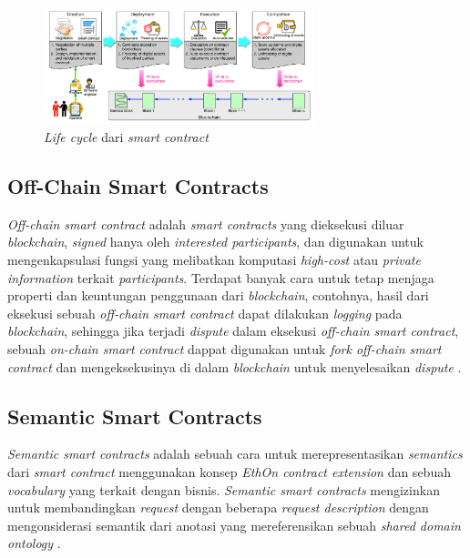 \begin{figure}
	\centering
	\includegraphics[width=0.7\textwidth]{resources/chapter-2/sc-lifecycle.png}
	\caption{\textit{Life cycle} dari \textit{smart contract} \parencite{zheng2020overview}}
	\label{image:sc-lifecycle}
\end{figure}

\subsection{Off-Chain Smart Contracts}
\label{subsec:off-chain-smart-contracts}

\textit{Off-chain smart contract} adalah \textit{smart contracts} yang dieksekusi diluar \textit{blockchain}, \textit{signed} hanya oleh \textit{interested participants}, dan digunakan untuk mengenkapsulasi fungsi yang melibatkan komputasi \textit{high-cost} atau \textit{private information} terkait \textit{participants}. Terdapat banyak cara untuk tetap menjaga properti dan keuntungan penggunaan dari \textit{blockchain}, contohnya, hasil dari eksekusi sebuah \textit{off-chain smart contract} dapat dilakukan \textit{logging} pada \textit{blockchain}, sehingga jika terjadi \textit{dispute} dalam eksekusi \textit{off-chain smart contract}, sebuah \textit{on-chain smart contract} dappat digunakan untuk \textit{fork off-chain smart contract} dan mengeksekusinya di dalam \textit{blockchain} untuk menyelesaikan \textit{dispute} \parencite{zou2019smart}.

\subsection{Semantic Smart Contracts}
\label{subsec:semantic-smart-contracts}
\textit{Semantic smart contracts} adalah sebuah cara untuk merepresentasikan \textit{semantics} dari \textit{smart contract} menggunakan konsep \textit{EthOn contract extension} dan sebuah \textit{vocabulary} yang terkait dengan bisnis. \textit{Semantic smart contracts} mengizinkan untuk membandingkan \textit{request} dengan beberapa \textit{request description} dengan mengonsiderasi semantik dari anotasi yang mereferensikan sebuah \textit{shared domain ontology} \parencite{baqa2019semantic}.
